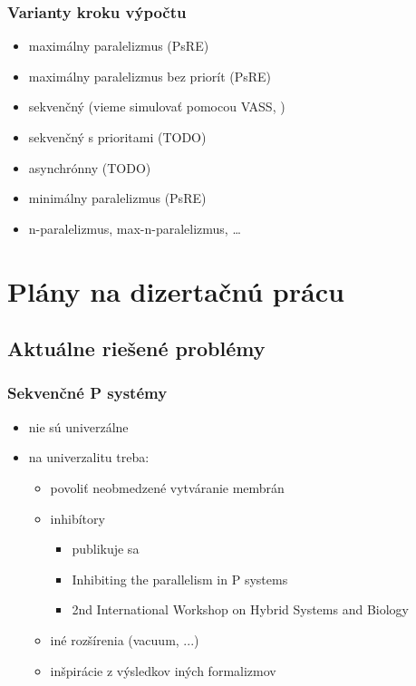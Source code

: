 \begin{frame}[t]\frametitle{Varianty kroku výpočtu}
\begin{itemize}
  \item maximálny paralelizmus (PsRE)
  \item maximálny paralelizmus bez priorít (PsRE) \cite{Sosik:2002:WithoutPriorities}
  \item sekvenčný (vieme simulovať pomocou VASS, \cite{Dang:2005:Sequential})
  \item sekvenčný s prioritami (TODO)
  \item asynchrónny (TODO)
  \item minimálny paralelizmus (PsRE) \cite{Ciobanu:2007:MinimalParallelism}
  \item n-paralelizmus, max-n-paralelizmus, \dots
\end{itemize}
\end{frame}
\note{}



\section{Plány na dizertačnú prácu} %
\label{sec:plany_na_dizertacnu_pracu}

\subsection{Aktuálne riešené problémy} %
\label{sub:aktualne_riesene_problemy}

\begin{frame}[t]\frametitle{Sekvenčné P systémy}
\begin{itemize}
  \item nie sú univerzálne
  \item na univerzalitu treba:
  \begin{itemize}
    \item povoliť neobmedzené vytváranie membrán \cite{Dang:2005:Sequential}
    \item inhibítory
      \begin{itemize}
        \item publikuje sa
        \item Inhibiting the parallelism in P systems
        \item 2nd International Workshop on Hybrid Systems and Biology
      \end{itemize}
    \item iné rozšírenia (vacuum, ...)
    \item inšpirácie z výsledkov iných formalizmov
  \end{itemize}
\end{itemize}
\end{frame}
\note{}


